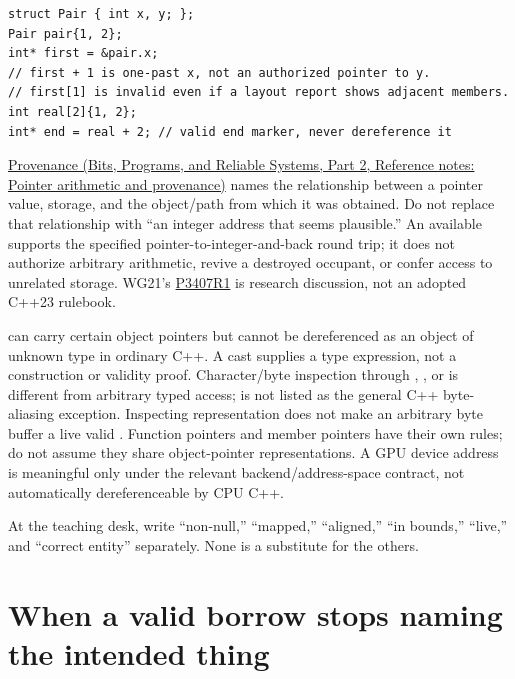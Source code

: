 \begin{verbatim}
struct Pair { int x, y; };
Pair pair{1, 2};
int* first = &pair.x;
// first + 1 is one-past x, not an authorized pointer to y.
// first[1] is invalid even if a layout report shows adjacent members.
int real[2]{1, 2};
int* end = real + 2; // valid end marker, never dereference it
\end{verbatim}

\href{../01-Bits-Programs-and-Reliable-Systems-P02/main.pdf\#nameddest=appendix-6af5921bc853}{Provenance (Bits, Programs, and Reliable Systems, Part 2, Reference notes: Pointer arithmetic and provenance)} names the relationship between a pointer value, storage, and the object/path from which it was obtained. Do not replace that relationship with ``an integer address that seems plausible.'' An available  supports the specified pointer-to-integer-and-back round trip; it does not authorize arbitrary arithmetic, revive a destroyed occupant, or confer access to unrelated storage. WG21's \href{https://www.open-std.org/jtc1/sc22/wg21/docs/papers/2025/p3407r1.html}{P3407R1} is research discussion, not an adopted C++23 rulebook.

 can carry certain object pointers but cannot be dereferenced as an object of unknown type in ordinary C++. A cast supplies a type expression, not a construction or validity proof. Character/byte inspection through , , or  is different from arbitrary typed access;  is not listed as the general C++ byte-aliasing exception. Inspecting representation does not make an arbitrary byte buffer a live valid . Function pointers and member pointers have their own rules; do not assume they share object-pointer representations. A GPU device address is meaningful only under the relevant backend/address-space contract, not automatically dereferenceable by CPU C++.

At the teaching desk, write ``non-null,'' ``mapped,'' ``aligned,'' ``in bounds,'' ``live,'' and ``correct entity'' separately. None is a substitute for the others.

\section{When a valid borrow stops naming the intended thing}\label{05-engine-i-ch003-when-a-valid-borrow-stops-naming-the-intended-thing}

